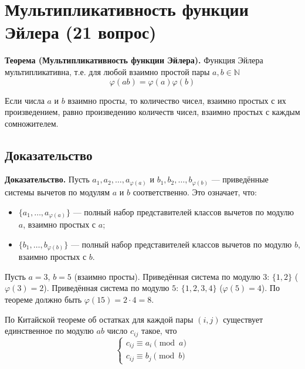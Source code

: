\documentclass[a4paper,12pt]{article}
\theoremstyle{definition}
\theoremstyle{plain}
\theoremstyle{remark}
\begin{document}
	
	
	
	
	
	
	\newpage
	\section{Мультипликативность функции Эйлера (21 вопрос)}
	
	\noindent \textbf{Теорема (Мультипликативность функции Эйлера).}
	Функция Эйлера мультипликативна, т.е. для любой взаимно простой пары $a, b \in \mathbb{N}$
	\[
	\varphi(ab) = \varphi(a) \varphi(b)
	\]
	
	\begin{tcolorbox}[colback=red!5, colframe=red!70!black, title=Формулировка]
		Если числа $a$ и $b$ взаимно просты, то количество чисел, взаимно простых с их произведением, равно произведению количеств чисел, взаимно простых с каждым сомножителем.
	\end{tcolorbox}
	
	\subsection{Доказательство}
	
	\noindent \textbf{Доказательство.}
	Пусть $a_1, a_2, \dots, a_{\varphi(a)}$ и $b_1, b_2, \dots, b_{\varphi(b)}$ — приведённые системы вычетов по модулям $a$ и $b$ соответственно. Это означает, что:
	\begin{itemize}
		\item $\{a_1, \dots, a_{\varphi(a)}\}$ — полный набор представителей классов вычетов по модулю $a$, взаимно простых с $a$;
		\item $\{b_1, \dots, b_{\varphi(b)}\}$ — полный набор представителей классов вычетов по модулю $b$, взаимно простых с $b$.
	\end{itemize}
	
	\begin{tcolorbox}[colback=blue!5, colframe=blue!40!black, title=Пример для пояснения]
		Пусть $a = 3$, $b = 5$ (взаимно просты). 
		Приведённая система по модулю $3$: $\{1, 2\}$ ($\varphi(3)=2$).
		Приведённая система по модулю $5$: $\{1, 2, 3, 4\}$ ($\varphi(5)=4$).
		По теореме должно быть $\varphi(15)=2\cdot4=8$.
	\end{tcolorbox}
	
	\medskip
	По Китайской теореме об остатках для каждой пары $(i, j)$ существует единственное по модулю $ab$ число $c_{ij}$ такое, что
	\[
	\begin{cases}
		c_{ij} \equiv a_i \pmod{a} \\
		c_{ij} \equiv b_j \pmod{b}
	\end{cases}
	\]
	
\end{document}

